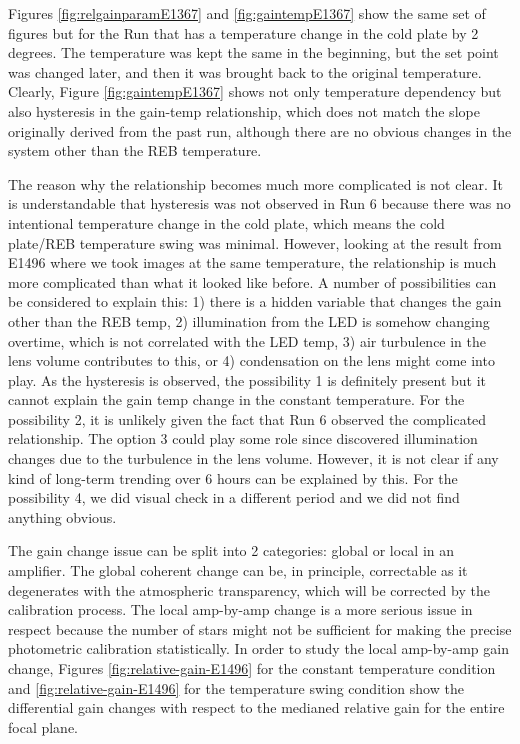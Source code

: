 Figures \ref{fig:relgainparamE1367} and \ref{fig:gaintempE1367} show the same set of figures but for the Run that has a temperature change in the cold plate by 2 degrees.
The temperature was kept the same in the beginning, but the set point was changed later, and then it was brought back to the original temperature. 
Clearly, Figure \ref{fig:gaintempE1367} shows not only temperature dependency but also hysteresis in the gain-temp relationship, which does not match the slope originally derived from the past run, although there are no obvious changes in the system other than the REB temperature.


The reason why the relationship becomes much more complicated is not clear. It is understandable that hysteresis was not observed in Run 6 because there was no intentional temperature change in the cold plate, which means the cold plate/REB temperature swing was minimal. However, looking at the result from E1496 where we took images at the same temperature, the relationship is much more complicated than what it looked like before. A number of possibilities can be considered to explain this: 1) there is a hidden variable that changes the gain other than the REB temp, 2) illumination from the LED is somehow changing overtime, which is not correlated with the LED temp, 3) air turbulence in the lens volume contributes to this, or 4) condensation on the lens might come into play. As the hysteresis is observed, the possibility 1 is definitely present but it cannot explain the gain temp change in the constant temperature. For the possibility 2, it is unlikely given the fact that Run 6 observed the complicated relationship. The option 3 could play some role since \citet{2024arXiv241113386B} discovered illumination changes due to the turbulence in the lens volume. However, it is not clear if any kind of long-term trending over 6 hours can be explained by this. For the possibility 4, we did visual check in a different period and we did not find anything obvious. 

The gain change issue can be split into 2 categories: global or local in an amplifier.  The global coherent change can be, in principle, correctable as it degenerates with the atmospheric transparency, which will be corrected by the calibration process. The local amp-by-amp change is a more serious issue in respect because the number of stars might not be sufficient for making the precise photometric calibration statistically. In order to study the local amp-by-amp gain change, Figures \ref{fig:relative-gain-E1496} for the constant temperature condition and \ref{fig:relative-gain-E1496} for the temperature swing condition show the differential gain changes with respect to the medianed relative gain for the entire focal plane. %

